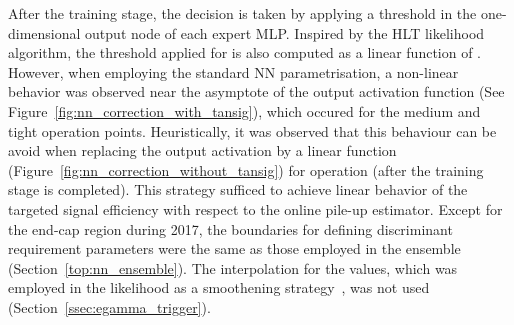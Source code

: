 After the training stage, the decision is taken by applying a threshold in the
one-dimensional output node of each expert MLP.\@ 
Inspired by the HLT likelihood algorithm, the threshold applied for
\rnn is also computed as a linear function of \avgmu{}.
However, when employing the standard NN parametrisation, a non-linear
behavior was observed near the asymptote of the output activation 
function (See Figure~\ref{fig:nn_correction_with_tansig}), which occured
for the medium and tight operation points. Heuristically, it was 
observed that this behaviour can be avoid when replacing the output
activation by a linear function (Figure~\ref{fig:nn_correction_without_tansig})
for operation (after the training stage is completed).
This strategy sufficed to achieve linear
behavior of the targeted signal efficiency with respect to the online pile-up
estimator. Except for the end-cap region during 2017, the boundaries for
defining discriminant requirement parameters were the same as those employed in
the \rnn ensemble (Section~\ref{top:nn_ensemble}). The 
interpolation for the \et{} values, which was employed in the likelihood as a smoothening strategy~\cite{aaboud2019electron}, was
not used (Section~\ref{ssec:egamma_trigger}).



